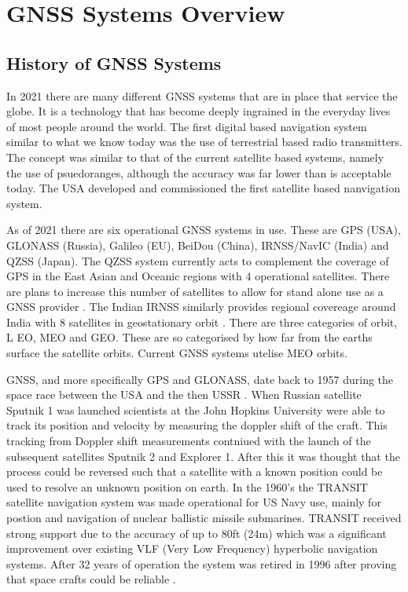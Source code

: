 
\chapter{GNSS Systems Overview} %

\label{Chapter2} %


\section{History of GNSS Systems} \label{sec:GNSSHistory}
In 2021 there are many different GNSS systems that are in place that service the globe. It is a technology that has become deeply ingrained in the everyday lives of most
people around the world. The first digital based navigation system similar to what we know today was the use of terrestrial based radio transmitters. The concept was
similar to that of the current satellite based systems, namely the use of psuedoranges, although the accuracy was far lower than is acceptable today. The USA developed
and commissioned the first satellite based nanvigation system.

As of 2021 there are six operational GNSS systems in use. These are GPS (USA), GLONASS (Russia), Galileo (EU), BeiDou (China), IRNSS/NavIC (India) and QZSS (Japan). The
QZSS system currently acts to complement the coverage of GPS in the East Asian and Oceanic regions with 4 operational satellites. There are plans to increase this number
of satellites to allow for stand alone use as a GNSS provider \cite{RN47}. The Indian IRNSS similarly provides regional covereage around India with 8 satellites in
geostationary orbit \cite{RN55} . There are three categories of orbit, L EO, MEO and GEO. These are so categorised by how far from the earths surface the satellite orbits.
Current GNSS systems utelise MEO orbits.

GNSS, and more specifically GPS and GLONASS, date back to 1957 during the space race between the USA and the then USSR \cite{RN43}. When Russian satellite Sputnik 1 was
launched scientists at the John Hopkins University were able to track its position and velocity by measuring the doppler shift of the craft. This tracking from Doppler
shift measurements contniued with the launch of the subsequent satellites Sputnik 2 and Explorer 1. After this it was thought that the process could be reversed such that
a satellite with a known position could be used to resolve an unknown position on earth. In the 1960's the TRANSIT satellite navigation system was made operational for US
Navy use, mainly for postion and navigation of nuclear ballistic missile submarines. TRANSIT received strong support due to the accuracy of up to 80ft (24m) which was a
significant improvement over existing VLF (Very Low Frequency) hyperbolic navigation systems. After 32 years of operation the system was retired in 1996 after proving
that space crafts could be reliable \cite{RN45}. 


